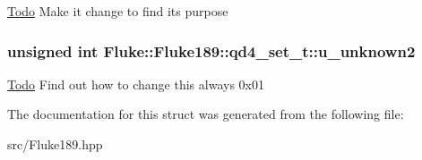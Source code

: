 \label{structFluke_1_1Fluke189_1_1qd4__set__t_aa49bec7dfd9d22c392297cdff277afd9}
\begin{Desc}
\item[\hyperlink{todo__todo000018}{Todo}]Make it change to find its purpose \end{Desc}
\hypertarget{structFluke_1_1Fluke189_1_1qd4__set__t_a7ac5798f6713dc4b811b2388d9374c74}{
\subsubsection[{u\_\-unknown2}]{\setlength{\rightskip}{0pt plus 5cm}unsigned int {\bf Fluke::Fluke189::qd4\_\-set\_\-t::u\_\-unknown2}}}
\label{structFluke_1_1Fluke189_1_1qd4__set__t_a7ac5798f6713dc4b811b2388d9374c74}
\begin{Desc}
\item[\hyperlink{todo__todo000019}{Todo}]Find out how to change this always 0x01 \end{Desc}


The documentation for this struct was generated from the following file:\begin{DoxyCompactItemize}
\item 
src/Fluke189.hpp\end{DoxyCompactItemize}
